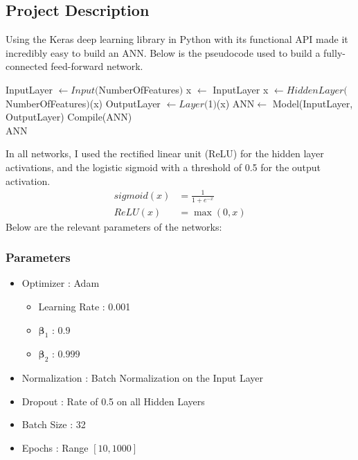 \documentclass[letterpaper]{article}
\begin{document}
\subsection{Project Description} 
\par
Using the Keras %
deep learning library in Python with its functional API made it incredibly easy to build an ANN. Below is the pseudocode used to build a fully-connected
 feed-forward network.
\begin{algorithmic}[1]
\State InputLayer $\gets Input($NumberOfFeatures$)$
\State x $\gets$ InputLayer
        \State x $\gets HiddenLayer($NumberOfFeatures$)$(x)
\EndFor
\State OutputLayer $\gets Layer($1$)$(x)
\State ANN$\gets$ Model(InputLayer, OutputLayer)
\State Compile(ANN) \\
\Return ANN
\EndProcedure
\end{algorithmic}
\par
In all networks, I used the rectified linear unit (ReLU) for the hidden layer activations, and the logistic sigmoid with a threshold of 0.5
 for the output activation.
 \begin{align}
	sigmoid(x) &= \frac{1}{1 + e^{-x}} \\
	ReLU(x) &= \max(0, x)
\end{align}
Below are the relevant parameters of the networks: 
\subsubsection{Parameters}
\begin{itemize}
	\item
	Optimizer : Adam \cite{adam}
	\begin{itemize}
		\item
		Learning Rate : 0.001
		\item
		$\boldsymbol\beta_1$ : $0.9$
		\item
		$\boldsymbol\beta_2$ : $0.999$
	\end{itemize}
	\item
	Normalization : Batch Normalization on the Input Layer
	\item
	Dropout : Rate of 0.5 on all Hidden Layers
	\item
	Batch Size : 32
	\item
	Epochs : Range $[10, 1000]$
\end{itemize}



\end{document}
